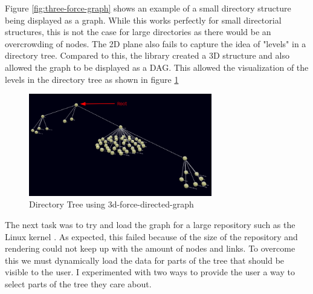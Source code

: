 Figure \ref{fig:three-force-graph} shows an example of a small directory structure being displayed as a graph. While this works perfectly for small directorial structures, this is not the case for large directories as there would be an overcrowding of nodes. The 2D plane also fails to capture the idea of "levels" in a directory tree. Compared to this, the library \cite{3dforcegraph} created a 3D structure and also allowed the graph to be displayed as a DAG. This allowed the visualization of the levels in the directory tree as shown in figure \ref{fig:3d-force-directed-graph}

\begin{figure}[!htbp]
    \includegraphics[width=8cm]{figs/3d-force-directed-graph_sample.png}
    \centering
    \caption{Directory Tree using 3d-force-directed-graph}
    \label{fig:3d-force-directed-graph}
\end{figure}

The next task was to try and load the graph for a large repository such as the Linux kernel \cite{linux}. As expected, this failed because of the size of the repository and rendering could not keep up with the amount of nodes and links. To overcome this we must dynamically load the data for parts of the tree that should be visible to the user. I experimented with two ways to provide the user a way to select parts of the tree they care about.

